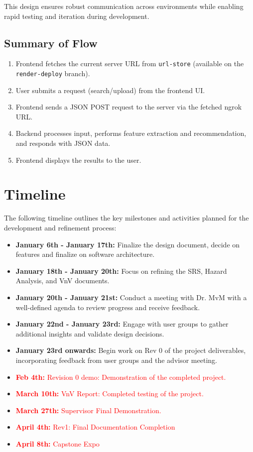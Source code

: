 \documentclass[12pt, titlepage]{article}
\begin{document}
This design ensures robust communication across environments while enabling rapid testing and iteration during development.

\subsection*{Summary of Flow}
\begin{enumerate}
    \item Frontend fetches the current server URL from \texttt{url-store} (available on the \texttt{render-deploy} branch).
    \item User submits a request (search/upload) from the frontend UI.
    \item Frontend sends a JSON POST request to the server via the fetched ngrok URL.
    \item Backend processes input, performs feature extraction and recommendation, and responds with JSON data.
    \item Frontend displays the results to the user.
\end{enumerate}

\endgroup


\section{Timeline}

The following timeline outlines the key milestones and activities planned for the development and refinement process:

\begin{itemize}
    \item \textbf{January 6th - January 17th:} Finalize the design document, decide on features and finalize on software architecture.
    \item \textbf{January 18th - January 20th:} Focus on refining the SRS, Hazard Analysis, and VnV documents.
    \item \textbf{January 20th - January 21st:} Conduct a meeting with Dr. MvM with a well-defined agenda to review progress and receive feedback.
    \item \textbf{January 22nd - January 23rd:} Engage with user groups to gather additional insights and validate design decisions.
    \item \textbf{January 23rd onwards:} Begin work on Rev 0 of the project deliverables, incorporating feedback from user groups and the advisor meeting.
    \item \textcolor{red}{\textbf{Feb 4th:} Revision 0 demo: Demonstration of the completed project.}
    \item \textcolor{red}{\textbf{March 10th:} VnV Report: Completed testing of the project.}
    \item \textcolor{red}{\textbf{March 27th:} Supervisor Final Demonstration.}
    \item \textcolor{red}{\textbf{April 4th:} Rev1: Final Documentation Completion}
    \item \textcolor{red}{\textbf{April 8th:} Capstone Expo}
\end{itemize}
\end{document}
